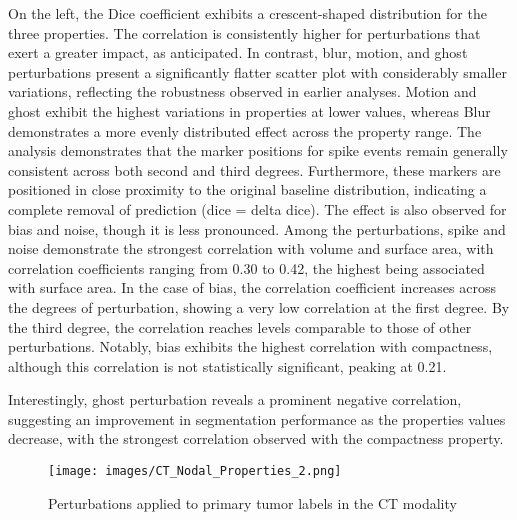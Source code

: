On the left, the Dice coefficient exhibits a crescent-shaped distribution for the three properties. The correlation is consistently higher for perturbations that exert a greater impact, as anticipated. In contrast, blur, motion, and ghost perturbations present a significantly flatter scatter plot with considerably smaller variations, reflecting the robustness observed in earlier analyses. 
Motion and ghost exhibit the highest variations in properties at lower values, whereas Blur demonstrates a more evenly distributed effect across the property range.
The analysis demonstrates that the marker positions for spike events remain generally consistent across both second and third degrees. Furthermore, these markers are positioned in close proximity to the original baseline distribution, indicating a complete removal of prediction (dice = delta dice). The effect is also observed for bias and noise, though it is less pronounced.
Among the perturbations, spike and noise demonstrate the strongest correlation with volume and surface area, with correlation coefficients ranging from 0.30 to 0.42, the highest being associated with surface area. 
\newpage
In the case of bias, the correlation coefficient increases across the degrees of perturbation, showing a very low correlation at the first degree. By the third degree, the correlation reaches levels comparable to those of other perturbations. Notably, bias exhibits the highest correlation with compactness, although this correlation is not statistically significant, peaking at 0.21.

Interestingly, ghost perturbation reveals a prominent negative correlation, suggesting an improvement in segmentation performance as the properties values decrease, with the strongest correlation observed with the compactness property.
\begin{figure}[ht]
    \centering
    \texttt{[image: images/CT\_Nodal\_Properties\_2.png]}
    \caption{Perturbations applied to primary tumor labels in the CT modality}
    \label{fig:three_subfigures}
\end{figure}

